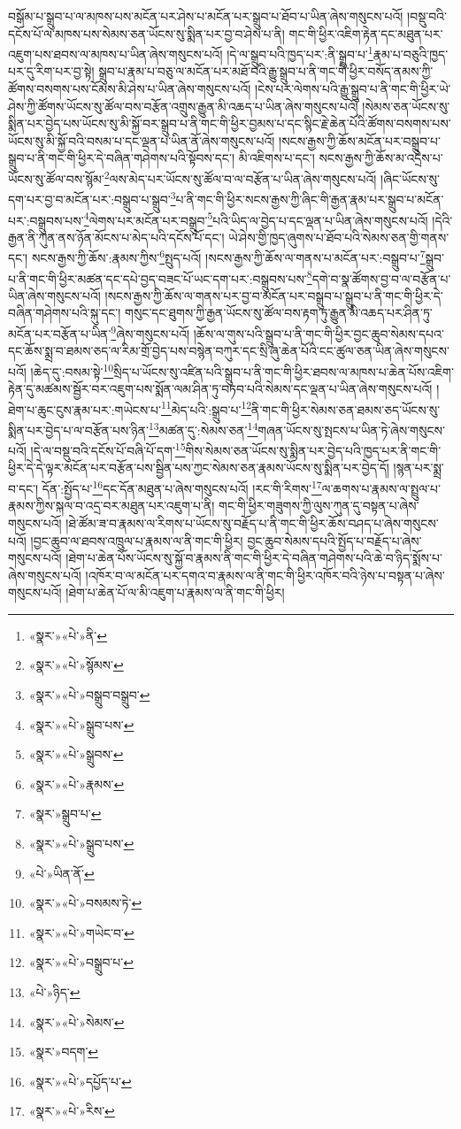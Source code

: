 བསྒོམ་པ་སྒྲུབ་པ་ལ་མཁས་པས་མངོན་པར་ཤེས་པ་མངོན་པར་སྒྲུབ་པ་ཐོབ་པ་ཡིན་ཞེས་གསུངས་པའོ། །བསྡུ་བའི་དངོས་པོ་ལ་མཁས་པས་སེམས་ཅན་ཡོངས་སུ་སྨིན་པར་བྱ་བ་ཤེས་པ་ནི། གང་གི་ཕྱིར་འཇིག་རྟེན་དང་མཐུན་པར་འཇུག་པས་ཐབས་ལ་མཁས་པ་ཡིན་ཞེས་གསུངས་པའོ། །དེ་ལ་སྒྲུབ་པའི་ཁྱད་པར་:ནི་སྒྲུབ་པ་\footnote{«སྣར་»«པེ་»ནི་}རྣམ་པ་བཅུའི་ཁྱད་པར་དུ་རིག་པར་བྱ་སྟེ། སྒྲུབ་པ་རྣམ་པ་བཅུ་ལ་མངོན་པར་མཐོ་བའི་རྒྱུ་སྒྲུབ་པ་ནི་གང་གི་ཕྱིར་བསོད་ནམས་ཀྱི་ཚོགས་བསགས་པས་ངོམས་མི་ཤེས་པ་ཡིན་ཞེས་གསུངས་པའོ། །ངེས་པར་ལེགས་པའི་རྒྱུ་སྒྲུབ་པ་ནི་གང་གི་ཕྱིར་ཡེ་ཤེས་ཀྱི་ཚོགས་ཡོངས་སུ་ཚོལ་བས་བརྩོན་འགྲུས་རྒྱུན་མི་འཆད་པ་ཡིན་ཞེས་གསུངས་པའོ། །སེམས་ཅན་ཡོངས་སུ་སྨིན་པར་བྱེད་པས་ཡོངས་སུ་མི་སྐྱོ་བར་སྒྲུབ་པ་ནི་གང་གི་ཕྱིར་བྱམས་པ་དང་སྙིང་རྗེ་ཆེན་པོའི་ཚོགས་བསགས་པས་ཡོངས་སུ་མི་སྐྱོ་བའི་བསམ་པ་དང་ལྡན་པ་ཡིན་ནོ་ཞེས་གསུངས་པའོ། །སངས་རྒྱས་ཀྱི་ཆོས་མངོན་པར་བསྒྲུབ་པ་སྒྲུབ་པ་ནི་གང་གི་ཕྱིར་དེ་བཞིན་གཤེགས་པའི་སྟོབས་དང་། མི་འཇིགས་པ་དང་། སངས་རྒྱས་ཀྱི་ཆོས་མ་འདྲེས་པ་ཡོངས་སུ་ཚོལ་བས་སྙོམ་\footnote{«སྣར་»«པེ་»སྙོམས་}ལས་མེད་པར་ཡོངས་སུ་ཚོལ་བ་ལ་བརྩོན་པ་ཡིན་ཞེས་གསུངས་པའོ། །ཞིང་ཡོངས་སུ་དག་པར་བྱ་བ་མངོན་པར་:བསྒྲུབ་པ་སྒྲུབ་\footnote{«སྣར་»«པེ་»བསྒྲུབ་བསྒྲུབ་}པ་ནི་གང་གི་ཕྱིར་སངས་རྒྱས་ཀྱི་ཞིང་གི་རྒྱན་རྣམ་པར་སྒྲུབ་པ་མངོན་པར་:བསྒྲུབས་པས་\footnote{«སྣར་»«པེ་»སྒྲུབ་པས་}ལེགས་པར་མངོན་པར་བསྒྲུབ་\footnote{«སྣར་»«པེ་»སྒྲུབས་}པའི་ཡིད་ལ་བྱེད་པ་དང་ལྡན་པ་ཡིན་ཞེས་གསུངས་པའོ། །དེའི་རྒྱན་ནི་ཀུན་ནས་ཉོན་མོངས་པ་མེད་པའི་དངོས་པོ་དང་། ཡེ་ཤེས་གྱི་ཁྱད་ཞུགས་པ་ཐོབ་པའི་སེམས་ཅན་གྱི་གནས་དང་། སངས་རྒྱས་ཀྱི་ཆོས་:རྣམས་ཀྱིས་\footnote{«སྣར་»«པེ་»རྣམས་}སྤུད་པའོ། །སངས་རྒྱས་ཀྱི་ཆོས་ལ་གནས་པ་མངོན་པར་:བསྒྲུབ་པ་\footnote{«སྣར་»སྒྲུབ་པ་}སྒྲུབ་པ་ནི་གང་གི་ཕྱིར་མཚན་དང་དཔེ་བྱད་བཟང་པོ་ཡང་དག་པར་:བསྒྲུབས་པས་\footnote{«སྣར་»«པེ་»སྒྲུབ་པས་}དགེ་བ་སྣ་ཚོགས་བྱ་བ་ལ་བརྩོན་པ་ཡིན་ཞེས་གསུངས་པའོ། །སངས་རྒྱས་ཀྱི་ཆོས་ལ་གནས་པར་བྱ་བ་མངོན་པར་བསྒྲུབ་པ་སྒྲུབ་པ་ནི་གང་གི་ཕྱིར་དེ་བཞིན་གཤེགས་པའི་སྐུ་དང་། གསུང་དང་ཐུགས་ཀྱི་རྒྱན་ཡོངས་སུ་ཚོལ་བས་རྟག་ཏུ་རྒྱུན་མི་འཆད་པར་ཤིན་ཏུ་མངོན་པར་བརྩོན་པ་ཡིན་\footnote{«པེ་»ཡིན་ནོ་}ཞེས་གསུངས་པའོ། །ཆོས་ལ་གུས་པའི་སྒྲུབ་པ་ནི་གང་གི་ཕྱིར་བྱང་ཆུབ་སེམས་དཔའ་དང་ཆོས་སྨྲ་བ་ཐམས་ཅད་ལ་རིམ་གྲོ་བྱེད་པས་བསྙེན་བཀུར་དང་སྲི་ཞུ་ཆེན་པོའི་ངང་ཚུལ་ཅན་ཡིན་ཞེས་གསུངས་པའོ། །ཆེད་དུ་:བསམ་སྟེ་\footnote{«སྣར་»«པེ་»བསམས་ཏེ་}སྲིད་པ་ཡོངས་སུ་འཛིན་པའི་སྒྲུབ་པ་ནི་གང་གི་ཕྱིར་ཐབས་ལ་མཁས་པ་ཆེན་པོས་འཇིག་རྟེན་དུ་མཚམས་སྦྱོར་བར་འཇུག་པས་སྨོན་ལམ་ཤིན་ཏུ་བཏབ་པའི་སེམས་དང་ལྡན་པ་ཡིན་ཞེས་གསུངས་པའོ། །ཐེག་པ་ཆུང་ངུས་རྣམ་པར་:གཡེངས་པ་\footnote{«སྣར་»«པེ་»གཡེང་བ་}མེད་པའི་:སྒྲུབ་པ་\footnote{«སྣར་»«པེ་»བསྒྲུབ་པ་}ནི་གང་གི་ཕྱིར་སེམས་ཅན་ཐམས་ཅད་ཡོངས་སུ་སྨིན་པར་བྱེད་པ་ལ་བརྩོན་པས་ཉིན་\footnote{«པེ་»ཉིད་}མཚན་དུ་:སེམས་ཅན་\footnote{«སྣར་»«པེ་»སེམས་}གཞན་ཡོངས་སུ་སྤངས་པ་ཡིན་ཏེ་ཞེས་གསུངས་པའོ། །དེ་ལ་བསྡུ་བའི་དངོས་པོ་བཞི་པོ་དག་\footnote{«སྣར་»བདག་}གིས་སེམས་ཅན་ཡོངས་སུ་སྨིན་པར་བྱེད་པའི་ཁྱད་པར་ནི་གང་གི་ཕྱིར་དེ་དེ་ལྟར་མངོན་པར་བརྩོན་པས་སྦྱིན་པས་ཀྱང་སེམས་ཅན་རྣམས་ཡོངས་སུ་སྨིན་པར་བྱེད་དོ། །སྙན་པར་སྨྲ་བ་དང་། དོན་:སྤྱོད་པ་\footnote{«སྣར་»«པེ་»དཔྱོད་པ་}དང་དོན་མཐུན་པ་ཞེས་གསུངས་པའོ། །རང་གི་རིགས་\footnote{«སྣར་»«པེ་»རིས་}ལ་ཆགས་པ་རྣམས་ལ་སྤྲུལ་པ་རྣམས་ཀྱིས་སྐལ་བ་འདྲ་བར་མཐུན་པར་འཇུག་པ་ནི། གང་གི་ཕྱིར་གཟུགས་ཀྱི་ལུས་ཀུན་དུ་བསྟན་པ་ཞེས་གསུངས་པའོ། །ཐེ་ཚོམ་ཟ་བ་རྣམས་ལ་རིགས་པ་ཡོངས་སུ་བརྗོད་པ་ནི་གང་གི་ཕྱིར་ཆོས་བཤད་པ་ཞེས་གསུངས་པའོ། །བྱང་ཆུབ་ལ་ཐབས་འཁྲུལ་པ་རྣམས་ལ་ནི་གང་གི་ཕྱིར། བྱང་ཆུབ་སེམས་དཔའི་སྤྱོད་པ་བརྗོད་པ་ཞེས་གསུངས་པའོ། །ཐེག་པ་ཆེན་པོས་ཡོངས་སུ་སྐྱོ་བ་རྣམས་ནི་གང་གི་ཕྱིར་དེ་བཞིན་གཤེགས་པའི་ཆེ་བ་ཉིད་སྨོས་པ་ཞེས་གསུངས་པའོ། །འཁོར་བ་ལ་མངོན་པར་དགའ་བ་རྣམས་ལ་ནི་གང་གི་ཕྱིར་འཁོར་བའི་ཉེས་པ་བསྟན་པ་ཞེས་གསུངས་པའོ། །ཐེག་པ་ཆེན་པོ་ལ་མི་འཇུག་པ་རྣམས་ལ་ནི་གང་གི་ཕྱིར། 